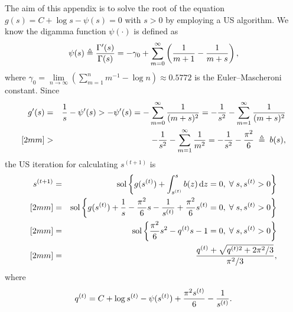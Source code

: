 The aim of this appendix is to solve the root of the equation $g(s)=C+\log s-\psi(s)= 0$ with $s>0$ by employing a US algorithm. We know the digamma function  $\psi(\cdot)$ is defined as
\begin{eqnarray}
   \psi(s)\triangleq\frac{\Gamma'(s)}{\Gamma(s)}=-\gamma_0+\sum_{m=0}^{\infty}\left(\frac{1}{m+1}-\frac{1}{m+s}\right), \nonumber
\end{eqnarray}
where $\gamma_0=\lim\limits_{n\to\infty}\left(\sum\limits_{m=1}^nm^{-1}-\log n\right)\approx0.5772$ is the Euler--Mascheroni constant. Since
\begin{eqnarray}
   g'(s)&=&\frac{1}{s}-\psi'(s)>-\psi'(s)=-\sum_{m=0}^{\infty}\frac{1}{(m+s)^2}=-\frac{1}{s^2}-\sum_{m=1}^{\infty}\frac{1}{(m+s)^2} \nonumber \\ [2mm]
   &>&-\frac{1}{s^2}-\sum_{m=1}^{\infty}\frac{1}{m^2}=-\frac{1}{s^2}-\frac{\pi^2}{6}\;\triangleq\;b(s), \nonumber
\end{eqnarray}
the US iteration for calculating $s^{(t+1)}$ is
\begin{eqnarray}
   s^{(t+1)}&=&\mbox{sol}\left\{g(s^{(t)})+\int_{s^{(t)}}^{s}b(z)\,\mbox{d} z=0,\;\forall\;s,s^{(t)}>0\right\} \nonumber \\ [2mm]
   &=&\mbox{sol}\left\{g(s^{(t)})+\frac{1}{s}-\frac{\pi^2}{6}s-\frac{1}{s^{(t)}}+\frac{\pi^2}{6}s^{(t)}=0,\;\forall\;s,s^{(t)}>0\right\} \nonumber \\ [2mm]
   &=&\mbox{sol}\left\{\frac{\pi^2}{6}s^2-q^{(t)}s-1=0,\;\forall\;s,s^{(t)}>0\right\} \nonumber \\ [2mm]
   &=&\frac{q^{(t)}+\sqrt{q^{(t)2}+2\pi^2/3}}{\pi^2/3}, \nonumber
\end{eqnarray}
where
\begin{eqnarray}
   q^{(t)}=C+\log s^{(t)}-\psi(s^{(t)})+\frac{\pi^2s^{(t)}}{6}-\frac{1}{s^{(t)}}. \nonumber
\end{eqnarray}